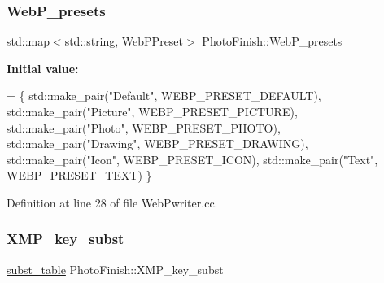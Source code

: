 \mbox{\label{namespace_photo_finish_a025b86e55467a4d75619d6a9098c4704}} 
\subsubsection{\texorpdfstring{Web\+P\+\_\+presets}{WebP\_presets}}
{\footnotesize\ttfamily std\+::map$<$std\+::string, Web\+P\+Preset$>$ Photo\+Finish\+::\+Web\+P\+\_\+presets}

{\bfseries Initial value\+:}
\begin{DoxyCode}
= \{ std::make\_pair(\textcolor{stringliteral}{"Default"}, WEBP\_PRESET\_DEFAULT),
                                                     std::make\_pair(\textcolor{stringliteral}{"Picture"}, WEBP\_PRESET\_PICTURE),
                                                     std::make\_pair(\textcolor{stringliteral}{"Photo"}, WEBP\_PRESET\_PHOTO),
                                                     std::make\_pair(\textcolor{stringliteral}{"Drawing"}, WEBP\_PRESET\_DRAWING),
                                                     std::make\_pair(\textcolor{stringliteral}{"Icon"}, WEBP\_PRESET\_ICON),
                                                     std::make\_pair(\textcolor{stringliteral}{"Text"}, WEBP\_PRESET\_TEXT) \}
\end{DoxyCode}


Definition at line 28 of file Web\+Pwriter.\+cc.

\mbox{\label{namespace_photo_finish_a991ab8204a327f645f121d78ca873348}} 
\subsubsection{\texorpdfstring{X\+M\+P\+\_\+key\+\_\+subst}{XMP\_key\_subst}}
{\footnotesize\ttfamily \hyperlink{namespace_photo_finish_a99d3cfc086c8264e778255f5ef2b8b19}{subst\+\_\+table} Photo\+Finish\+::\+X\+M\+P\+\_\+key\+\_\+subst}

